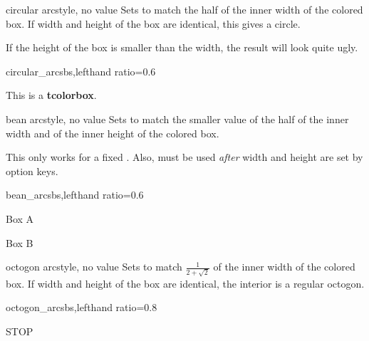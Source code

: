 \clearpage
\begin{docTcbKey}[][doc new=2015-05-05]{circular arc}{}{style, no value}
  Sets  to match the half of the inner width of the colored box.
  If width and height of the box are identical, this gives a circle.
  \begin{marker}
  If the height of the box is smaller than the width, the result will look
  quite ugly.
  \end{marker}
\begin{exdispExample*}{circular_arc}{sbs,lefthand ratio=0.6}
\begin{tcolorbox}[width=3cm,
  colback=red!5!white,
  colframe=red!75!black,
  halign=center,valign=center,
  square,circular arc]
This is a \textbf{tcolorbox}.
\end{tcolorbox}
\end{exdispExample*}
\end{docTcbKey}


\begin{docTcbKey}[][doc new=2015-05-05]{bean arc}{}{style, no value}
  Sets  to match the smaller value of the
  half of the inner width and of the inner height of the colored box.
  \begin{marker}
  This only works for a fixed . Also, 
  must be used \emph{after} width and height are set by option keys.
  \end{marker}
\begin{exdispExample*}{bean_arc}{sbs,lefthand ratio=0.6}

\begin{tcolorbox}[width=3cm,height=2cm,
  bean arc]
Box A
\end{tcolorbox}

\begin{tcolorbox}[width=2cm,height=3cm,
  bean arc]
Box B
\end{tcolorbox}
\end{exdispExample*}
\end{docTcbKey}

\begin{docTcbKey}[][doc new=2015-05-05]{octogon arc}{}{style, no value}
  Sets  to match $\frac{1}{2+\sqrt{2}}$ of the inner width
  of the colored box. If width and height of the box are identical,
  the interior is a regular octogon.
\begin{exdispExample*}{octogon_arc}{sbs,lefthand ratio=0.8}
\begin{tcolorbox}[enhanced,
  size=minimal,auto outer arc,
  width=2.1cm,octogon arc,
  colback=red,colframe=white,colupper=white,
  fontupper=\fontsize{7mm}{7mm}\selectfont\bfseries\sffamily,
  halign=center,valign=center,
  square,arc is angular,
  borderline={0.2mm}{-1mm}{red}  ]
STOP
\end{tcolorbox}
\end{exdispExample*}
\end{docTcbKey}

